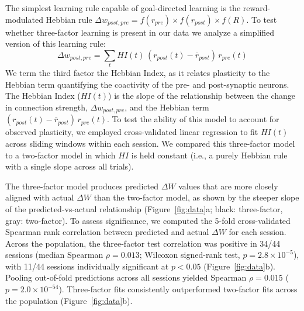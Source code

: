 \documentclass[
  journal=medium,
  manuscript=preprint,
  year=2026
]{aind-preprint}
\begin{document}
The simplest learning rule capable of goal-directed learning is the reward-modulated Hebbian rule $\Delta w_{post,pre} = f(r_{pre})\times f(r_{post}) \times f(R)$. To test whether three-factor learning is present in our data we analyze a simplified version of this learning rule:
\begin{equation}
    \Delta w_{post,pre} = \sum_t HI(t)\,(r_{post}(t)-\bar{r}_{post})\,r_{pre}(t)
\end{equation}
We term the third factor the Hebbian Index, as it relates plasticity to the Hebbian term quantifying the coactivity of the pre- and post-synaptic neurons. The Hebbian Index ($HI(t)$) is the slope of the relationship between the change in connection strength, $\Delta w_{post,pre}$, and the Hebbian term $(r_{post}(t)-\bar{r}_{post})\,r_{pre}(t)$. To test the ability of this model to account for observed plasticity, we employed cross-validated linear regression to fit $HI(t)$ across sliding windows within each session. We compared this three-factor model to a two-factor model in which $HI$ is held constant (i.e., a purely Hebbian rule with a single slope across all trials).

The three-factor model produces predicted $\Delta W$ values that are more closely aligned with actual $\Delta W$ than the two-factor model, as shown by the steeper slope of the predicted-vs-actual relationship (Figure~\ref{fig:data}a; black: three-factor, gray: two-factor). To assess significance, we computed the 5-fold cross-validated Spearman rank correlation between predicted and actual $\Delta W$ for each session. Across the population, the three-factor test correlation was positive in 34/44 sessions (median Spearman $\rho = 0.013$; Wilcoxon signed-rank test, $p = 2.8 \times 10^{-5}$), with 11/44 sessions individually significant at $p < 0.05$ (Figure~\ref{fig:data}b). Pooling out-of-fold predictions across all sessions yielded Spearman $\rho = 0.015$ ($p = 2.0 \times 10^{-54}$). Three-factor fits consistently outperformed two-factor fits across the population (Figure~\ref{fig:data}b).
\end{document}

